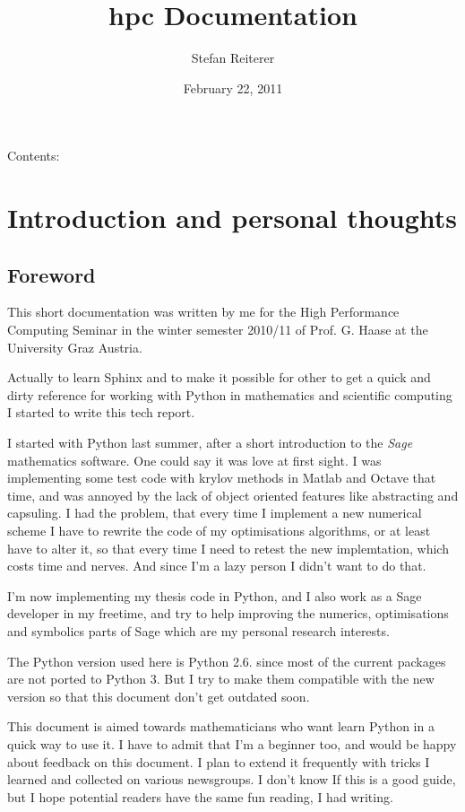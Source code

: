 \documentclass[letterpaper,10pt,english]{manual}
\title{hpc Documentation}
\date{February 22, 2011}
\author{Stefan Reiterer}
\begin{document}
\maketitle
\tableofcontents
\hypertarget{--doc-index}{}


Contents:

\resetcurrentobjects
\hypertarget{--doc-Introduction}{}

\chapter{Introduction and personal thoughts}


\section{Foreword}

This short documentation was written by me for the High Performance Computing Seminar
in the winter semester 2010/11 of Prof. G. Haase at the University Graz Austria.

Actually to learn Sphinx and to make it possible for other to get a quick and dirty reference
for working with Python in mathematics and scientific computing I started to write this tech report.

I started with Python last summer, after a short introduction to the \emph{Sage} mathematics software. One could
say it was love at first sight. I was implementing some test code with krylov methods in Matlab and Octave that
time, and was annoyed by the lack of object oriented features like abstracting and capsuling. I had the problem, that
every time I implement a new numerical scheme I have to rewrite the code of my optimisations algorithms, or at least have
to alter it, so that every time I need to retest the new implemtation, which costs time and nerves. And since I'm a
lazy person I didn't want to do that.

I'm now implementing my thesis code in Python, and I also work as a Sage developer in my freetime, and try to help
improving the numerics, optimisations and symbolics parts of Sage which are my personal research interests.

The Python version used here is Python 2.6. since most of the current packages are not ported to Python 3.
But I try to make them compatible with the new version so that this document don't get outdated soon.

This document is aimed towards mathematicians who want learn Python in a quick way to use it.
I have to admit that I'm a beginner too, and would be happy about
feedback on this document. I plan to extend it frequently with tricks
I learned and collected on various newsgroups. I don't know If this is
a good guide, but I hope potential readers have the same fun reading,
I had writing.
\end{document}
